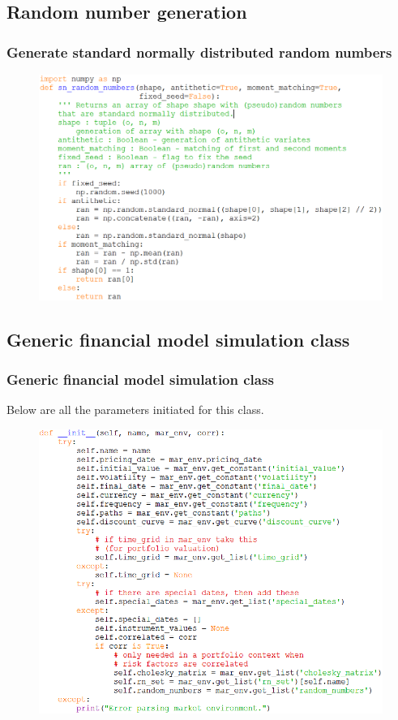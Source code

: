 \documentclass{beamer}
\begin{document}
\subsection{Random number generation}

\begin{frame}
\frametitle{Generate standard normally distributed random numbers}
\begin{figure}[H]
	\includegraphics[scale=0.42]{sn_random_numbers.png}
\end{figure}
\end{frame}

\subsection{Generic financial model simulation class}

\begin{frame}
\frametitle{Generic financial model simulation class}
Below are all the parameters initiated for this class.
\begin{figure}[H]
	\includegraphics[scale=0.41]{parameters_simulation_class.png}
\end{figure}
\end{frame}
\end{document}
